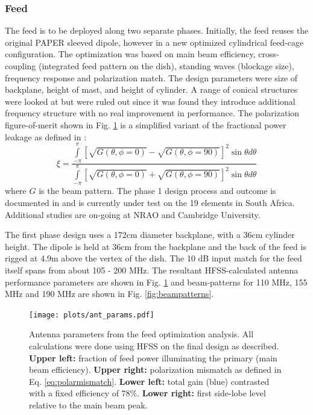 \documentclass[preprint,11pt]{aastex}
\newcommand{\integral}{\int\limits}
\begin{document}
\subsubsection{Feed}
\label{sec:feed}
The feed is to be deployed along two separate phases.  Initially, the feed reuses the original PAPER sleeved dipole, however in a new optimized cylindrical feed-cage configuration.  The optimization was based on main beam efficiency, cross-coupling (integrated feed pattern on the dish), standing waves (blockage size), frequency response and polarization match.  The design parameters were size of backplane, height of mast, and height of cylinder.  A range of conical structures were looked at but were ruled out since it was found they introduce additional frequency structure with no real improvement in performance.  The polarization figure-of-merit shown in Fig. \ref{fig:ant_params} is a simplified variant of the fractional power leakage as defined in \cite{Moore_et_al2015}:
\begin{equation}
\xi = \frac{\integral_{-\pi}^{\pi}\left[\sqrt{G(\theta,\phi=0)} - \sqrt{G(\theta,\phi=90)}\right]^2\sin\theta d\theta}
               {\integral_{-\pi}^{\pi}\left[\sqrt{G(\theta,\phi=0)} + \sqrt{G(\theta,\phi=90)}\right]^2\sin\theta d\theta}
     \label{eq:polarmismatch}
\end{equation}
where $G$ is the beam pattern.
The phase 1 design process and outcome is documented in  \cite{feedmemo} and is currently under test on the 19 elements in South Africa. Additional studies are on-going at NRAO and Cambridge University.

The first phase design uses a 172cm diameter backplane, with a 36cm cylinder height.  The dipole is held at 36cm from the backplane and the back of the feed is rigged at 4.9m above the vertex of the dish.  The 10 dB input match for the feed itself spans from about 105 - 200 MHz.  The resultant HFSS-calculated antenna performance parameters are shown in Fig. \ref{fig:ant_params} and beam-patterns for 110 MHz, 155 MHz and 190 MHz are shown in Fig. \ref{fig:beampatterns}.

\begin{figure}[h!]
\centerline{
\texttt{[image: plots/ant\_params.pdf]}
}
\caption{\small Antenna parameters from the feed optimization analysis.  All calculations were done using HFSS on the final design as described.  {\bf Upper left:}  fraction of feed power illuminating the primary (main beam efficiency).  {\bf Upper right:}  polarization mismatch as defined in Eq.  \ref{eq:polarmismatch}.  {\bf Lower left:}  total gain (blue) contrasted with a fixed efficiency of 78\%.  {\bf Lower right:}  first side-lobe level relative to the main beam peak.}
\label{fig:ant_params}
\end{figure}
\end{document}
